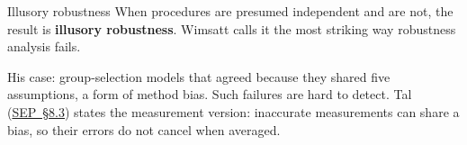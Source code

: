 \documentclass[aspectratio=169,11pt]{beamer}
\begin{document}
\begin{frame}[label=illusory]{Illusory robustness}
When procedures are presumed independent and are not, the result is \textbf{\textcolor{fail}{illusory robustness}}. Wimsatt calls it the most striking way robustness analysis fails.

\vspace{0.3em}
\begin{center}
\end{center}

\vspace{0.2em}
{\small His case: group-selection models that agreed because they shared five assumptions, a form of method bias. Such failures are hard to detect. Tal (\href{https://plato.stanford.edu/entries/measurement-science/}{SEP~\S8.3}) states the measurement version: inaccurate measurements can share a bias, so their errors do not cancel when averaged.}
\end{frame}
\end{document}
